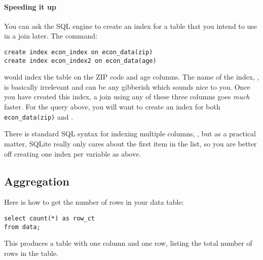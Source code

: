 \paragraph{Speeding it up}
You can ask the SQL engine to create an index for a table that you
intend to use in a join later. The command:
\begin{lstlisting}
create index econ_index on econ_data(zip)
create index econ_index2 on econ_data(age)
\end{lstlisting}
would index the table  on the ZIP code and age columns.
The name of the index, , is basically irrelevant and can
be any gibberish which sounds nice to you. Once you have created this
index, a join using any of these three columns goes {\sl much} faster.
For the query above, you will want to create an index for both {\tt
econ\_data(zip)} and .

There is standard SQL syntax for indexing multiple columns, 
, but as a
practical matter, SQLite really only cares about the first item in the
list, so you are better off creating one index per variable as above.

\subsection{Aggregation}
Here is how to get the number of rows in your data table:
\begin{lstlisting}
select count(*) as row_ct 
from data;
\end{lstlisting}
This produces a table with one column and one row, listing the total number of rows in the  table.

\label{crosstabs}

